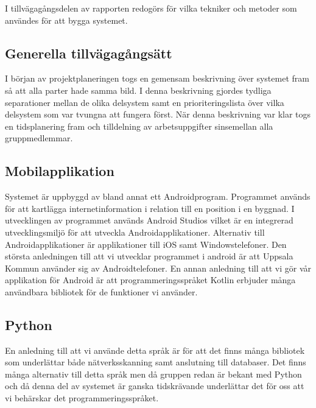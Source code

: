 \documentclass[swedish, a4paper,12pt]{article}
\begin{document}

I tillvägagångsdelen av rapporten redogörs för vilka tekniker och metoder som användes för att bygga systemet.

\subsection{Generella tillvägagångsätt}
I början av projektplaneringen togs en gemensam beskrivning över systemet fram så att alla parter hade samma bild. I denna beskrivning gjordes tydliga separationer mellan de olika delsystem samt en prioriteringslista över vilka delsystem som var tvungna att fungera först. När denna beskrivning var klar togs en tidsplanering fram och tilldelning av arbetsuppgifter sinsemellan alla gruppmedlemmar.

\subsection{Mobilapplikation}
Systemet är uppbyggd av bland annat ett Androidprogram. Programmet används för att kartlägga internetinformation i relation till en position i en byggnad. I utvecklingen av programmet används Android Studios vilket är en integrerad utvecklingsmiljö för att utveckla Androidapplikationer. Alternativ till Androidapplikationer är applikationer till iOS samt Windowstelefoner. Den största anledningen till att vi utvecklar programmet i android är att Uppsala Kommun använder sig av Androidtelefoner. En annan anledning till att vi gör vår applikation för Android är att programmeringsspråket Kotlin erbjuder många användbara bibliotek för de funktioner vi använder.

\subsection{Python} %
En anledning till att vi använde detta språk är för att det finns många bibliotek som underlättar både nätverksskanning samt anslutning till databaser. Det finns många alternativ till detta språk men då gruppen redan är bekant med Python och då denna del av systemet är ganska tidskrävande underlättar det för oss att vi behärskar det programmeringsspråket.
\end{document}
